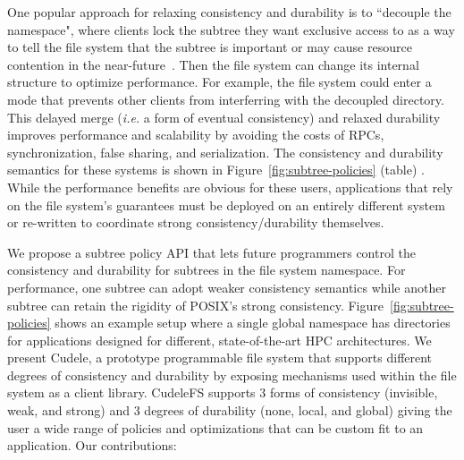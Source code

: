 One popular approach for relaxing consistency and durability is to ``decouple
the namespace", where clients lock the subtree they want exclusive access to as
a way to tell the file system that the subtree is important or may cause
resource contention in the near-future~\cite{grider:pdsw2015-marfs,
zheng:pdsw2015-deltafs, zheng:pdsw2014-batchfs, ren:sc2014-indexfs,
bent:slides-twotiers}. Then the file system can change its internal structure
to optimize performance. For example, the file system could enter a mode that
prevents other clients from interferring with the decoupled directory.  This
delayed merge ({\it i.e.} a form of eventual consistency) and relaxed
durability improves performance and scalability by avoiding the costs of RPCs,
synchronization, false sharing, and serialization.  The consistency and
durability semantics for these systems is shown in
Figure~\ref{fig:subtree-policies} (table) . While the performance benefits are obvious
for these users, applications that rely on the file system's guarantees must be
deployed on an entirely different system or re-written to coordinate strong
consistency/durability themselves.

%

We propose a subtree policy API that lets future programmers control
the consistency and durability for subtrees in the file system namespace. For performance, one
subtree can adopt weaker consistency semantics while another subtree can retain
the rigidity of POSIX's strong consistency. Figure~\ref{fig:subtree-policies}
shows an example setup where a single global namespace has directories for
applications designed for different, state-of-the-art HPC architectures.  We
present Cudele, a prototype programmable file system that supports different
degrees of consistency and durability by exposing mechanisms used within the
file system as a client library.  CudeleFS supports 3 forms of consistency
(invisible, weak, and strong) and 3 degrees of durability (none, local, and
global) giving the user a wide range of policies and optimizations
that can be custom fit to an application. Our contributions: 

